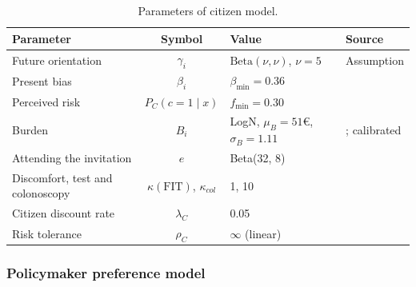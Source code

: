 \documentclass[12pt]{article}
\begin{document}
\begin{table}[htbp]
\centering
\footnotesize
\caption{Parameters of citizen model.}
\label{tab:citizen_params}
\begin{tabular}{l c l l}
\toprule
\textbf{Parameter} & \textbf{Symbol} & \textbf{Value} & \textbf{Source} \\
\midrule
Future orientation & $\gamma_i$ & $\mathrm{Beta}(\nu,\nu)$, $\nu = 5$ & Assumption \\
Present bias & $\beta_i$ & $\beta_{\min} = 0.36$ & \citealp{cheung2026meta} \\
Perceived risk & $P_C(c=1\mid x)$ & $f_{\min} = 0.30$ & \citealp{le2023exploring} \\
Burden & $B_i$ & LogN, $\mu_B = 51$€, $\sigma_B = 1.11$ & \citealp{jonas2010willingness}; calibrated \\
Attending the invitation & $e$ & Beta(32, 8) & \citealp{molina2014} \\
Discomfort, test and colonoscopy & $\kappa(\text{FIT})$, $\kappa_{col}$ & 1, 10 & \citealp{jonas2007patient} \\
Citizen discount rate & $\lambda_C$ & 0.05 & \citealp{mahboub2014stated} \\
Risk tolerance & $\rho_C$ & $\infty$ (linear) & \citealp{pliskin1980utility} \\
\bottomrule
\end{tabular}
\end{table}

\subsubsection{Policymaker preference model}\label{sec:pm_model}
\end{document}
